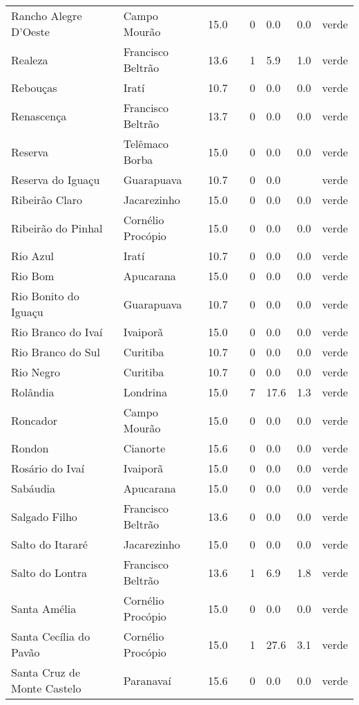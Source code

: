 \begin{longtable}{l|lllllll}
  Rancho Alegre D'Oeste & Campo Mourão & 15.0 &  & 0 & 0.0 & 0.0 & verde \\ 
  Realeza & Francisco Beltrão & 13.6 &  & 1 & 5.9 & 1.0 & verde \\ 
  Rebouças & Iratí & 10.7 &  & 0 & 0.0 & 0.0 & verde \\ 
  Renascença & Francisco Beltrão & 13.7 &  & 0 & 0.0 & 0.0 & verde \\ 
  Reserva & Telêmaco Borba & 15.0 &  & 0 & 0.0 & 0.0 & verde \\ 
  Reserva do Iguaçu & Guarapuava & 10.7 &  & 0 & 0.0 &  & verde \\ 
  Ribeirão Claro & Jacarezinho & 15.0 &  & 0 & 0.0 & 0.0 & verde \\ 
  Ribeirão do Pinhal & Cornélio Procópio & 15.0 &  & 0 & 0.0 & 0.0 & verde \\ 
  Rio Azul & Iratí & 10.7 &  & 0 & 0.0 & 0.0 & verde \\ 
  Rio Bom & Apucarana & 15.0 &  & 0 & 0.0 & 0.0 & verde \\ 
  Rio Bonito do Iguaçu & Guarapuava & 10.7 &  & 0 & 0.0 & 0.0 & verde \\ 
  Rio Branco do Ivaí & Ivaiporã & 15.0 &  & 0 & 0.0 & 0.0 & verde \\ 
  Rio Branco do Sul & Curitiba & 10.7 &  & 0 & 0.0 & 0.0 & verde \\ 
  Rio Negro & Curitiba & 10.7 &  & 0 & 0.0 & 0.0 & verde \\ 
  Rolândia & Londrina & 15.0 &  & 7 & 17.6 & 1.3 & verde \\ 
  Roncador & Campo Mourão & 15.0 &  & 0 & 0.0 & 0.0 & verde \\ 
  Rondon & Cianorte & 15.6 &  & 0 & 0.0 & 0.0 & verde \\ 
  Rosário do Ivaí & Ivaiporã & 15.0 &  & 0 & 0.0 & 0.0 & verde \\ 
  Sabáudia & Apucarana & 15.0 &  & 0 & 0.0 & 0.0 & verde \\ 
  Salgado Filho & Francisco Beltrão & 13.6 &  & 0 & 0.0 & 0.0 & verde \\ 
  Salto do Itararé & Jacarezinho & 15.0 &  & 0 & 0.0 & 0.0 & verde \\ 
  Salto do Lontra & Francisco Beltrão & 13.6 &  & 1 & 6.9 & 1.8 & verde \\ 
  Santa Amélia & Cornélio Procópio & 15.0 &  & 0 & 0.0 & 0.0 & verde \\ 
  Santa Cecília do Pavão & Cornélio Procópio & 15.0 &  & 1 & 27.6 & 3.1 & verde \\ 
  Santa Cruz de Monte Castelo & Paranavaí & 15.6 &  & 0 & 0.0 & 0.0 & verde \\ 

\end{longtable}
